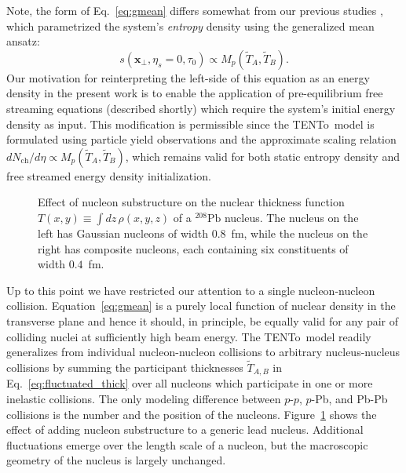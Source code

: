\documentclass[aps,prc,reprint,amsmath,nofootinbib]{revtex4-1}
\newcommand{\trento}{T\raisebox{-0.5ex}{R}ENTo}
\newcommand{\nch}{N_\text{ch}}
\newcommand{\T}{\tilde{T}}
\newcommand{\xv}{\mathbf x}
\begin{document}
Note, the form of Eq.~\eqref{eq:gmean} differs somewhat from our previous studies \cite{Moreland:2014oya, Bernhard:2016tnd}, which parametrized the system's \emph{entropy} density using the generalized mean ansatz:
\begin{equation}
  s(\xv_\perp, \eta_s=0, \tau_0) \propto M_p(\T_A, \T_B).
\end{equation}
Our motivation for reinterpreting the left-side of this equation as an energy density in the present work is to enable the application of pre-equilibrium free streaming equations (described shortly) which require the system's initial energy density as input.
This modification is permissible since the \trento\ model is formulated using particle yield observations and the approximate scaling relation $d\nch/d\eta \propto M_p(\T_A, \T_B)$, which remains valid for both static entropy density and free streamed energy density initialization.

\begin{figure}
  \caption{
    \label{fig:thickness}
    Effect of nucleon substructure on the nuclear thickness function $T(x, y) \equiv \int dz\, \rho(x, y, z)$ of a $^{208}\mathrm{Pb}$ nucleus.
    The nucleus on the left has Gaussian nucleons of width $0.8$~fm, while the nucleus on the right has composite nucleons, each containing six constituents of width $0.4$~fm.
  }
\end{figure}

Up to this point we have restricted our attention to a single nucleon-nucleon collision.
Equation~\eqref{eq:gmean} is a purely local function of nuclear density in the transverse plane and hence it should, in principle, be equally valid for any pair of colliding nuclei at sufficiently high beam energy.
The \trento\ model readily generalizes from individual nucleon-nucleon collisions to arbitrary nucleus-nucleus collisions by summing the participant thicknesses $\T_{A,B}$ in Eq.~\eqref{eq:fluctuated_thick} over all nucleons which participate in one or more inelastic collisions.
The only modeling difference between $p$-$p$, $p$-Pb, and Pb-Pb collisions is the number and the position of the nucleons.
Figure~\ref{fig:thickness} shows the effect of adding nucleon substructure to a generic lead nucleus.
Additional fluctuations emerge over the length scale of a nucleon, but the macroscopic geometry of the nucleus is largely unchanged.
\end{document}
